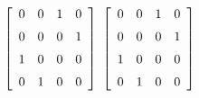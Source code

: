 {$\left[ \begin {array}{cccc} 0&0&1&0\\\noalign{\medskip}0&0&0&1
\\\noalign{\medskip}1&0&0&0\\\noalign{\medskip}0&1&0&0
\end {array} \right] $ 
}
{$ \left[ \begin {array}{cccc} 0&0&1&0\\\noalign{\medskip}0&0&0&1
\\\noalign{\medskip}1&0&0&0\\\noalign{\medskip}0&1&0&0
\end {array} \right]$}
